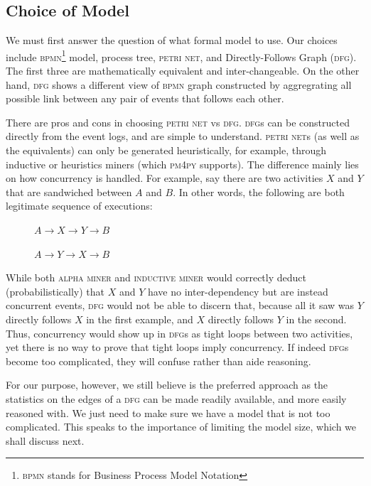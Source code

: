 \documentclass[conference]{IEEEtran}
\begin{document}
\subsection{Choice of Model}

We must first answer the
question of what formal model to use. Our choices include \textsc{bpmn}\footnote{\textsc{bpmn} stands for Business Process Model Notation}  model,
process tree, \textsc{petri net}, and Directly-Follows Graph (\textsc{dfg}). The
first three are mathematically equivalent and inter-changeable. On the other
hand, \textsc{dfg} shows a different view of \textsc{bpmn} graph constructed by aggregrating all possible link
between any pair of events that follows each other.

There are pros and cons in choosing \textsc{petri net} vs \textsc{dfg}. \textsc{dfg}s can be constructed
directly from the event logs, and are simple to understand. \textsc{petri net}s (as well
as the equivalents) can only be generated heuristically, for example, 
through inductive or heuristics miners (which \textsc{pm4py} supports).
The difference mainly lies on how concurrency is handled. For example,
say there are two activities $X$ and $Y$ that are sandwiched between
$A$ and $B$. In other words, the following are both legitimate sequence
of executions:

\vspace{0.5em}
$\phantom{xxxxx}A \rightarrow X \rightarrow Y \rightarrow B$

$\phantom{xxxxx}A \rightarrow Y \rightarrow X \rightarrow B$
\vspace{0.5em}


While both \textsc{alpha miner} and \textsc{inductive miner} would correctly deduct
(probabilistically) that $X$ and $Y$ have no inter-dependency but are
instead concurrent events, \textsc{dfg} would not be able to discern that, because
all it saw was $Y$ directly follows $X$ in the first example, and
$X$ directly follows $Y$ in the second. Thus, concurrency would
show up in \textsc{dfg}s as tight loops between two activities, yet there is no
way to prove that tight loops imply concurrency. If indeed \textsc{dfg}s
become too complicated, they will confuse rather than aide reasoning.

For our purpose, however, we still believe 
is the preferred approach as the statistics on the edges of a \textsc{dfg} can be
made readily available, and more easily reasoned with. We just need to make
sure we have a model that is not too complicated.
This speaks to the importance of limiting the model size, which we shall
discuss next.
\end{document}
